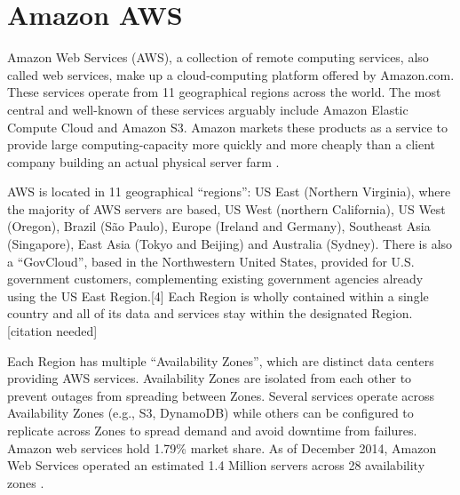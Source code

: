 \section{Amazon AWS}
\label{sec:s3_aws}

Amazon Web Services (AWS), a collection of remote computing services, also called web services, make up a cloud-computing platform offered by Amazon.com.\cite{aws_overview} These services operate from 11 geographical regions across the world. The most central and well-known of these services arguably include Amazon Elastic Compute Cloud and Amazon S3. Amazon markets these products as a service to provide large computing-capacity more quickly and more cheaply than a client company building an actual physical server farm \cite{aws_cloud}.

AWS is located in 11 geographical ``regions'': US East (Northern Virginia), where the majority of AWS servers are based,\cite{aws_stats1} US West (northern California), US West (Oregon), Brazil (São Paulo), Europe (Ireland and Germany), Southeast Asia (Singapore), East Asia (Tokyo and Beijing) and Australia (Sydney). There is also a ``GovCloud'', based in the Northwestern United States, provided for U.S. government customers, complementing existing government agencies already using the US East Region.[4] Each Region is wholly contained within a single country and all of its data and services stay within the designated Region.[citation needed]

Each Region has multiple ``Availability Zones'', which are distinct data centers providing AWS services. Availability Zones are isolated from each other to prevent outages from spreading between Zones. Several services operate across Availability Zones (e.g., S3, DynamoDB) while others can be configured to replicate across Zones to spread demand and avoid downtime from failures. Amazon web services hold 1.79\% market share. As of December 2014, Amazon Web Services operated an estimated 1.4 Million servers across 28 availability zones \cite{aws_stats2}.